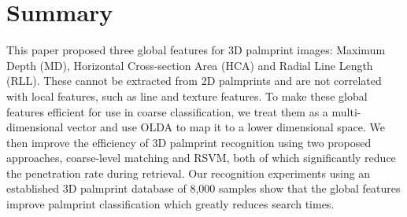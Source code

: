 \section{Summary}

This paper proposed three global features for 3D palmprint images: Maximum Depth (MD), Horizontal Cross-section Area (HCA) and Radial Line Length (RLL). These cannot be extracted from 2D palmprints and are not correlated with local features, such as line and texture features. To make these global features efficient for use in coarse classification, we treat them as a multi-dimensional vector and use OLDA to map it to a lower dimensional space. We then improve the efficiency of 3D palmprint recognition using two proposed approaches, coarse-level matching and RSVM, both of which significantly reduce the penetration rate during retrieval. Our recognition experiments using an established 3D palmprint database of 8,000 samples show that the global features improve palmprint classification which greatly reduces search times.